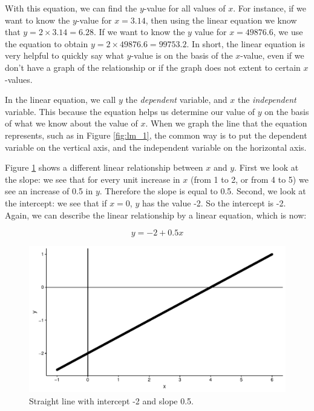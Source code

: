 \documentclass[]{book}\usepackage[]{graphicx}\usepackage[]{color}
\makeatletter
\def\maxwidth{ %
  \ifdim\Gin@nat@width>\linewidth
    \linewidth
  \else
    \Gin@nat@width
  \fi
}
\newenvironment{knitrout}{}{} %
\makeatother
\begin{document}
With this equation, we can find the $y$-value for all values of $x$. For instance, if we want to know the $y$-value for $x=3.14$, then using the linear equation we know that $y = 2 \times 3.14 = 6.28$. If we want to know the $y$ value for $x=49876.6$, we use the equation to obtain $y=2\times 49876.6 = 99753.2$. In short, the linear equation is very helpful to quickly say what $y$-value is on the basis of the $x$-value, even if we don't have a graph of the relationship or if the graph does not extent to certain $x$-values.


In the linear equation, we call $y$ the \textit{dependent} variable, and $x$ the \textit{independent} variable. This because the equation helps us determine our value of $y$ on the basis of what we know about the value of $x$. When we graph the line that the equation represents, such as in Figure \ref{fig:lm_1}, the common way is to put the dependent variable on the vertical axis, and the independent variable on the horizontal axis. 


Figure \ref{fig:lm_2} shows a different linear relationship between $x$ and $y$. First we look at the slope: we see that for every unit increase in $x$ (from 1 to 2, or from 4 to 5) we see an increase of 0.5 in $y$. Therefore the slope is equal to 0.5. Second, we look at the intercept: we see that if $x=0$, $y$ has the value -2. So the intercept is -2. Again, we can describe the linear relationship by a linear equation, which is now:

\begin{equation}
y = -2 + 0.5 x
\end{equation}



\begin{knitrout}
\color{fgcolor}\begin{figure}

{\centering \includegraphics[width=\maxwidth]{figure/lm_2-1} 

}

\caption[Straight line with intercept -2 and slope 0.5]{Straight line with intercept -2 and slope 0.5.}\label{fig:lm_2}
\end{figure}


\end{knitrout}
\end{document}
